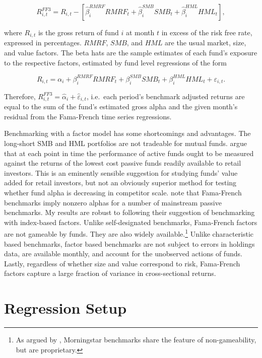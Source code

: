 \documentclass[openany]{book}
\let\rmarkdownfootnote\footnote%
\def\footnote{\protect\rmarkdownfootnote}
\theoremstyle{definition}
\theoremstyle{definition}
\theoremstyle{definition}
\theoremstyle{remark}
\begin{document}
\begin{equation}
R^{FF3}_{i,t} = R_{i,t} - \left[ \hat{\beta}^{RMRF}_i RMRF_t + \hat{\beta}^{SMB}_i SMB_t + \hat{\beta}^{HML}_i HML_t \right],
\end{equation}

where \(R_{i,t}\) is the gross return of fund \(i\) at month \(t\) in
excess of the risk free rate, expressed in percentages. \(RMRF\),
\(SMB\), and \(HML\) are the usual market, size, and value factors. The
beta hats are the sample estimates of each fund's exposure to the
respective factors, estimated by fund level regressions of the form

\begin{equation}
R_{i,t} = \alpha_i + \beta^{RMRF}_i RMRF_t + \beta^{SMB}_i SMB_t + \beta^{HML}_i HML_t + \varepsilon_{i,t}.
\end{equation}

Therefore, \(R^{FF3}_{i,t} = \hat{\alpha}_i + \hat{\varepsilon}_{i,t}\),
i.e.~each period's benchmark adjusted returns are equal to the sum of
the fund's estimated gross alpha and the given month's residual from the
Fama-French time series regressions.

Benchmarking with a factor model has some shortcomings and advantages.
The long-short SMB and HML portfolios are not tradeable for mutual
funds. \citet{bvb15} argue that at each point in time the performance of
active funds ought to be measured against the returns of the lowest cost
passive funds readily available to retail investors. This is an
eminently sensible suggestion for studying funds' value added for retail
investors, but not an obviously superior method for testing whether fund
alpha is decreasing in competitor scale. \citet{cpz12} note that
Fama-French benchmarks imply nonzero alphas for a number of mainstream
passive benchmarks. My results are robust to following their suggestion
of benchmarking with index-based factors. Unlike self-designated
benchmarks, Fama-French factors are not gameable by funds. They are also
widely available.\footnote{As argued by \citet{pst15}, Morningstar
  benchmarks share the feature of non-gameability, but are proprietary.}
Unlike characteristic based benchmarks, factor based benchmarks are not
subject to errors in holdings data, are available monthly, and account
for the unobserved actions of funds. Lastly, regardless of whether size
and value correspond to risk, Fama-French factors capture a large
fraction of variance in cross-sectional returns.

\section{Regression Setup}\label{regression-setup}
\end{document}

